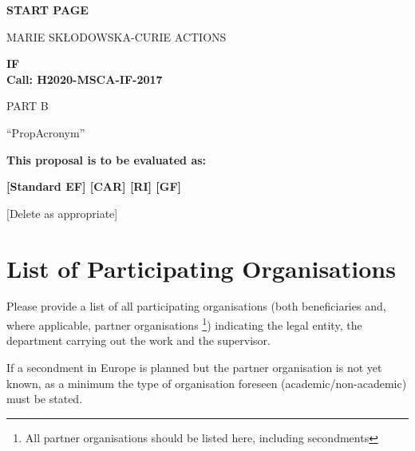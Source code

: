 
\phantom{a}
\vspace{15mm}
\begin{center}


        \Large{
      
     
        \textbf{START PAGE}
  
          \vspace{15mm}
          MARIE SK\L{}ODOWSKA-CURIE ACTIONS\\
          \vspace{1cm}
          
          \textbf{\acf{IF}}\\
          \textbf{Call: H2020-MSCA-IF-2017}
          \vspace{2cm}                   

          PART B
          \vspace{2.5cm}

          ``{\sc \ac{PropAcronym}\xspace}''
          \vspace{2cm}

          \textbf{This proposal is to be evaluated as:}
          \vspace{.5cm}

          \textbf{[Standard EF] [CAR] [RI] [GF]}\\
        }
        \large{[Delete as appropriate]}

  \end{center}
\vspace{1cm}

\newpage
\setcounter{tocdepth}{1}
\tableofcontents


\newpage
{}
\section*{List of Participating Organisations}
\label{sec:participants}

Please provide a list of all participating organisations (both beneficiaries and, where applicable, partner organisations%
\footnote{All partner organisations should be listed here, including secondments}) 
indicating the legal entity, the department carrying out the work and the supervisor.

\medskip\noindent
If a secondment in Europe is planned but the partner organisation is not yet known, as a minimum the type of organisation foreseen (academic/non-academic) must be stated.

